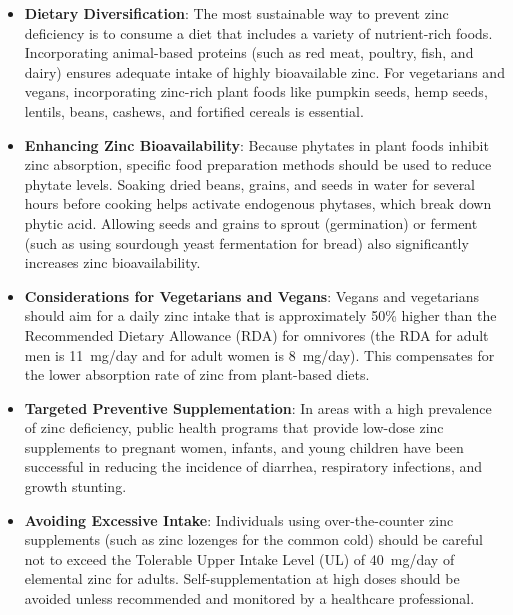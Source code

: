 \begin{itemize}
    \item \textbf{Dietary Diversification}: The most sustainable way to prevent zinc deficiency is to consume a diet that includes a variety of nutrient-rich foods. Incorporating animal-based proteins (such as red meat, poultry, fish, and dairy) ensures adequate intake of highly bioavailable zinc. For vegetarians and vegans, incorporating zinc-rich plant foods like pumpkin seeds, hemp seeds, lentils, beans, cashews, and fortified cereals is essential.
    \item \textbf{Enhancing Zinc Bioavailability}: Because phytates in plant foods inhibit zinc absorption, specific food preparation methods should be used to reduce phytate levels. Soaking dried beans, grains, and seeds in water for several hours before cooking helps activate endogenous phytases, which break down phytic acid. Allowing seeds and grains to sprout (germination) or ferment (such as using sourdough yeast fermentation for bread) also significantly increases zinc bioavailability.
    \item \textbf{Considerations for Vegetarians and Vegans}: Vegans and vegetarians should aim for a daily zinc intake that is approximately 50\% higher than the Recommended Dietary Allowance (RDA) for omnivores (the RDA for adult men is 11~mg/day and for adult women is 8~mg/day). This compensates for the lower absorption rate of zinc from plant-based diets.
    \item \textbf{Targeted Preventive Supplementation}: In areas with a high prevalence of zinc deficiency, public health programs that provide low-dose zinc supplements to pregnant women, infants, and young children have been successful in reducing the incidence of diarrhea, respiratory infections, and growth stunting.
    \item \textbf{Avoiding Excessive Intake}: Individuals using over-the-counter zinc supplements (such as zinc lozenges for the common cold) should be careful not to exceed the Tolerable Upper Intake Level (UL) of 40~mg/day of elemental zinc for adults. Self-supplementation at high doses should be avoided unless recommended and monitored by a healthcare professional.
\end{itemize}

